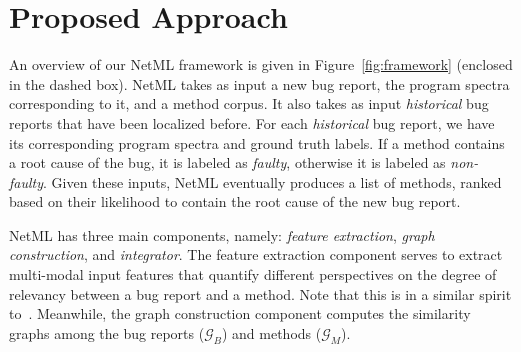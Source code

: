 \section{Proposed Approach}
\label{sec:approach}

An overview of our NetML framework is given in Figure~\ref{fig:framework} (enclosed in the dashed box). 
NetML takes as input a new bug report, the program spectra corresponding to it, and a method corpus. It also takes as input \emph{historical} bug reports that have been localized before. For each \textit{historical} bug report, we have its corresponding program spectra and ground truth labels. If a method contains a root cause of the bug, it is labeled as \textit{faulty}, otherwise it is labeled as \textit{non-faulty}. Given these inputs, NetML eventually produces a list of methods, ranked based on their likelihood to contain the root cause of the new bug report.


NetML has three main components, namely: \emph{feature extraction}, \emph{graph construction}, and \emph{integrator}. The feature extraction component serves to extract multi-modal input features that quantify different perspectives on the degree of relevancy between a bug report and a method. Note that this is in a similar spirit to~\cite{Le:2015:IRS:2786805.2786880}. Meanwhile, the graph construction component computes the similarity graphs among the bug reports ($\mathcal{G}_B$) and methods ($\mathcal{G}_M$).

